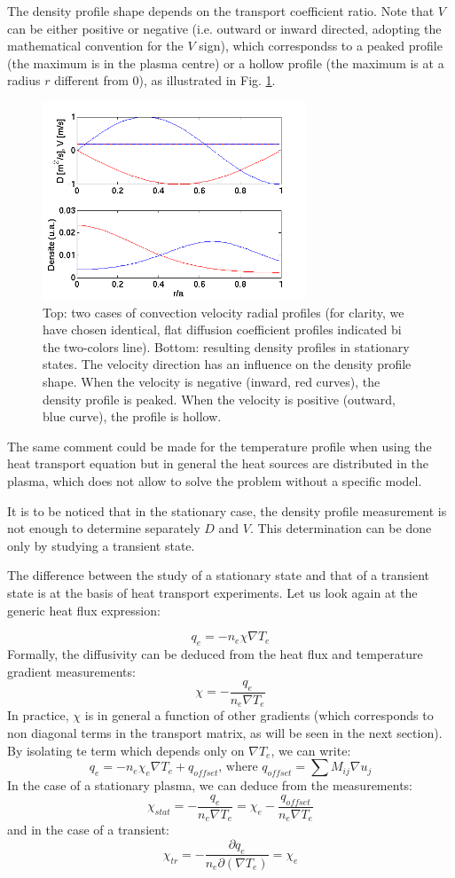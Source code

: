 The density profile shape depends on the transport coefficient ratio. Note that $V$ can be either positive or negative (i.e. outward or inward directed, adopting the mathematical convention for the $V$ sign), which correspondss to a peaked profile (the maximum is in the plasma centre) or a hollow profile (the maximum is at a radius $r$ different from 0), as illustrated in Fig. \ref{fig:Sens_piquage}.
\begin{figure}[htbp]
	\centering
		\includegraphics[width=0.70\textwidth]{Fig_Sens_piquage.png}
	\caption{Top: two cases of convection velocity radial profiles (for clarity, we have chosen identical, flat diffusion coefficient profiles indicated bi the two-colors line). Bottom: resulting density profiles in stationary states. The velocity direction has an influence on the density profile shape. When the velocity is negative (inward, red curves), the density profile is peaked. When the velocity is positive (outward, blue curve), the profile is hollow.}
	\label{fig:Sens_piquage}
\end{figure}

The same comment could be made for the temperature profile when using the heat transport equation but in general the heat sources are distributed in the plasma, which does not allow to solve the problem without a specific model.	

It is to be noticed that in the stationary case, the density profile measurement is not enough to determine separately $D$ and $V$. This determination can be done only by studying a transient state.

The difference between the study of a stationary state and that of a transient state is at the basis of heat transport experiments. Let us look again at the generic heat flux expression:

	\[
	q_e = -n_e\chi \nabla T_e
\]
Formally, the diffusivity can be deduced from the heat flux and temperature gradient measurements:
	\[
	\chi = -\frac{q_e}{n_e \nabla T_e}
\]
In practice, $\chi$ is in general a function of other gradients (which corresponds to non diagonal terms in the transport matrix, as will be seen in the next section). By isolating te term which depends only on $\nabla T_e$, we can write:
	\[
	q_e = -n_e\chi_e\nabla T_e + q_{offset} \mbox{, where } q_{offset} = \sum{M_{ij}\nabla u_j}
\]
In the case of a stationary plasma, we can deduce from the measurements:
	\[
	\chi_{stat} = -\frac{q_e}{n_e\nabla T_e} = \chi_e - \frac{q_{offset}}{n_e \nabla T_e}
\]
and in the case of a transient:
	\[
	\chi_{tr} = - \frac{\partial q_e}{n_e \partial \left( \nabla T_e\right)} = \chi_e
\]

